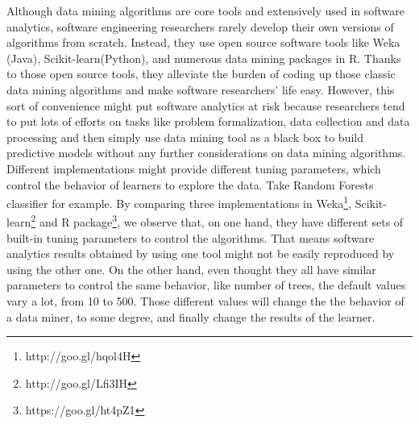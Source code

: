 Although data mining algorithms are core tools and extensively used in software analytics, software engineering 
researchers rarely develop their own versions of algorithms from scratch. Instead, they use
open source software tools like Weka (Java)\cite{hall2009weka}, 
Scikit-learn(Python)\cite{scikit-learn}, and numerous data mining packages in R. Thanks to those open 
source tools, they alleviate the burden of coding up those classic data mining algorithms and make
software researchers' life easy. However, this sort of convenience might put 
software analytics at risk because researchers tend to put lots of efforts on tasks like problem formalization, 
data collection and data processing and then simply use data mining tool as a black box to build 
predictive models without any further considerations on data mining algorithms\cite{sun2010discriminative,jalbert2008automated, antoniol2008bug,zanetti2013categorizing,lamkanfi2011comparing,tian2013drone, alipour2013contextual,lin2009empirical,hall11,me07b,choetkiertikul2015predicting,anvik2006should, bhattacharya2010fine}.
Different implementations might
provide different tuning parameters, which control the behavior of learners to explore the data.
Take Random Forests classifier for example.
By comparing three implementations in Weka\footnote {http://goo.gl/hqol4H}, 
Scikit-learn\footnote{http://goo.gl/Lfi3IH} and R package\footnote{https://goo.gl/ht4pZ1}, 
we observe that, on one hand, they have different sets of built-in tuning parameters
to control the algorithms. That means software analytics results obtained by
using one tool might not be easily reproduced by using the other one.
On the other hand, even thought they all have similar parameters to control
the same behavior, like number of trees, the default values vary a lot, from 10 to 500. 
Those different values will change the the behavior of a data miner, 
to some degree, and finally change the results of the learner.




